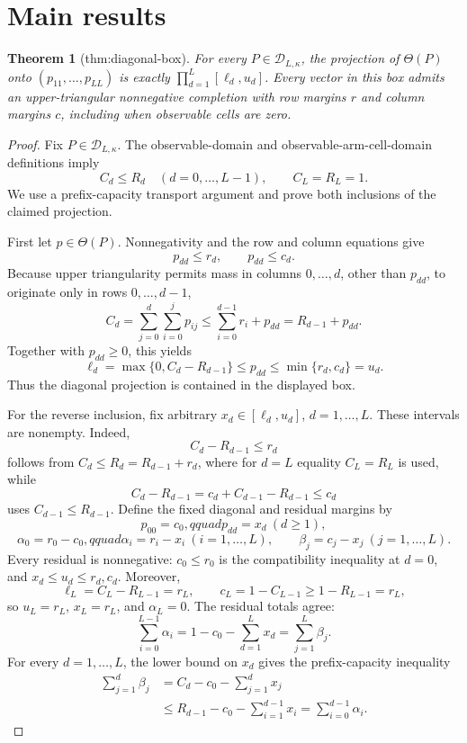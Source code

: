 \documentclass{article}
\newtheorem{theorem}{Theorem}
\begin{document}
\section{Main results}

\begin{theorem}[thm:diagonal-box]\label{thm:diagonal-box}
For every \(P\in\mathcal D_{L,\kappa}\), the projection of \(\Theta(P)\) onto \((p_{11},\ldots,p_{LL})\) is exactly \(\prod_{d=1}^{L}[\ell_d,u_d]\). Every vector in this box admits an upper-triangular nonnegative completion with row margins \(r\) and column margins \(c\), including when observable cells are zero.
\end{theorem}
\begin{proof}
Fix \(P\in\mathcal D_{L,\kappa}\).  The observable-domain and observable-arm-cell-domain definitions imply
\[
 C_d\le R_d\quad(d=0,\ldots,L-1),
 \qquad C_L=R_L=1.
\]
We use a prefix-capacity transport argument and prove both inclusions of the claimed projection.

First let \(p\in\Theta(P)\).  Nonnegativity and the row and column equations give
\[
 p_{dd}\le r_d,
 \qquad
 p_{dd}\le c_d.
\]
Because upper triangularity permits mass in columns \(0,\ldots,d\), other than \(p_{dd}\), to originate only in rows \(0,\ldots,d-1\),
\[
 C_d
 =\sum_{j=0}^{d}\sum_{i=0}^{j}p_{ij}
 \le \sum_{i=0}^{d-1}r_i+p_{dd}
 =R_{d-1}+p_{dd}.
\]
Together with \(p_{dd}\ge0\), this yields
\[
 \ell_d=\max\{0,C_d-R_{d-1}\}
 \le p_{dd}
 \le \min\{r_d,c_d\}=u_d.
\]
Thus the diagonal projection is contained in the displayed box.

For the reverse inclusion, fix arbitrary \(x_d\in[\ell_d,u_d]\), \(d=1,\ldots,L\).  These intervals are nonempty.  Indeed,
\[
 C_d-R_{d-1}\le r_d
\]
follows from \(C_d\le R_d=R_{d-1}+r_d\), where for \(d=L\) equality \(C_L=R_L\) is used, while
\[
 C_d-R_{d-1}
 =c_d+C_{d-1}-R_{d-1}
 \le c_d
\]
uses \(C_{d-1}\le R_{d-1}\).  Define the fixed diagonal and residual margins by
\[
 p_{00}=c_0,qquad p_{dd}=x_d\ (d\ge1),
\]
\[
 \alpha_0=r_0-c_0,qquad
 \alpha_i=r_i-x_i\ (i=1,\ldots,L),
 \qquad
 \beta_j=c_j-x_j\ (j=1,\ldots,L).
\]
Every residual is nonnegative: \(c_0\le r_0\) is the compatibility inequality at \(d=0\), and \(x_d\le u_d\le r_d,c_d\).  Moreover,
\[
 \ell_L=C_L-R_{L-1}=r_L,
 \qquad
 c_L=1-C_{L-1}\ge1-R_{L-1}=r_L,
\]
so \(u_L=r_L\), \(x_L=r_L\), and \(\alpha_L=0\).  The residual totals agree:
\[
 \sum_{i=0}^{L-1}\alpha_i
 =1-c_0-\sum_{d=1}^{L}x_d
 =\sum_{j=1}^{L}\beta_j.
\]
For every \(d=1,\ldots,L\), the lower bound on \(x_d\) gives the prefix-capacity inequality
\[
 \begin{aligned}
 \sum_{j=1}^{d}\beta_j
 &=C_d-c_0-\sum_{j=1}^{d}x_j\\
 &\le R_{d-1}-c_0-\sum_{i=1}^{d-1}x_i
 =\sum_{i=0}^{d-1}\alpha_i.
 \end{aligned}
\]


\end{proof}
\end{document}
